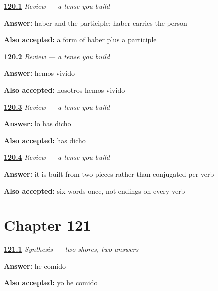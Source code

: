 \noindent\begin{minipage}[t]{\linewidth}
\raggedright
\hyperlink{review-ES-C49-repaso-perfecto-pieces}{\textbf{120.1}} \emph{Review — a tense you build}\par
\small \textbf{Answer:} haber and the participle; haber carries the person\par
\footnotesize \textbf{Also accepted:} a form of haber plus a participle
\end{minipage}\par\medskip

\noindent\begin{minipage}[t]{\linewidth}
\raggedright
\hyperlink{review-ES-C49-repaso-perfecto-build}{\textbf{120.2}} \emph{Review — a tense you build}\par
\small \textbf{Answer:} hemos vivido\par
\footnotesize \textbf{Also accepted:} nosotros hemos vivido
\end{minipage}\par\medskip

\noindent\begin{minipage}[t]{\linewidth}
\raggedright
\hyperlink{review-ES-C49-repaso-perfecto-irreg}{\textbf{120.3}} \emph{Review — a tense you build}\par
\small \textbf{Answer:} lo has dicho\par
\footnotesize \textbf{Also accepted:} has dicho
\end{minipage}\par\medskip

\noindent\begin{minipage}[t]{\linewidth}
\raggedright
\hyperlink{review-ES-C49-repaso-perfecto-cost}{\textbf{120.4}} \emph{Review — a tense you build}\par
\small \textbf{Answer:} it is built from two pieces rather than conjugated per verb\par
\footnotesize \textbf{Also accepted:} six words once, not endings on every verb
\end{minipage}\par\medskip

\section*{Chapter 121}

\noindent\begin{minipage}[t]{\linewidth}
\raggedright
\hyperlink{review-ES-C49-sintesis-dos-orillas-now}{\textbf{121.1}} \emph{Synthesis — two shores, two answers}\par
\small \textbf{Answer:} he comido\par
\footnotesize \textbf{Also accepted:} yo he comido
\end{minipage}\par\medskip

